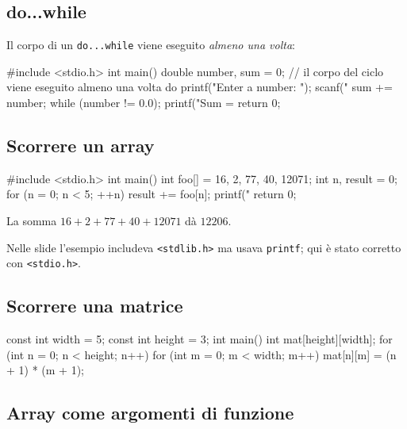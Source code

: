 \documentclass[11pt,a4paper]{article}
\begin{document}
\subsection{do...while}

Il corpo di un \lstinline|do...while| viene eseguito \emph{almeno una volta}:
\begin{codice}
#include <stdio.h>
int main() {
    double number, sum = 0;
    // il corpo del ciclo viene eseguito almeno una volta
    do {
        printf("Enter a number: ");
        scanf("%
        sum += number;
    } while (number != 0.0);
    printf("Sum = %
    return 0;
}
\end{codice}

\subsection{Scorrere un array}

\begin{codice}
#include <stdio.h>
int main() {
    int foo[] = {16, 2, 77, 40, 12071};
    int n, result = 0;
    for (n = 0; n < 5; ++n) {
        result += foo[n];
    }
    printf("%
    return 0;
}
\end{codice}
La somma $16 + 2 + 77 + 40 + 12071$ dà $12206$.

\begin{osservazione}
Nelle slide l'esempio includeva \lstinline|<stdlib.h>| ma usava \lstinline|printf|; qui è stato corretto con \lstinline|<stdio.h>|.
\end{osservazione}

\subsection{Scorrere una matrice}

\begin{codice}
const int width = 5;
const int height = 3;
int main() {
    int mat[height][width];
    for (int n = 0; n < height; n++)
        for (int m = 0; m < width; m++)
            mat[n][m] = (n + 1) * (m + 1);
}
\end{codice}

\subsection{Array come argomenti di funzione}
\end{document}
